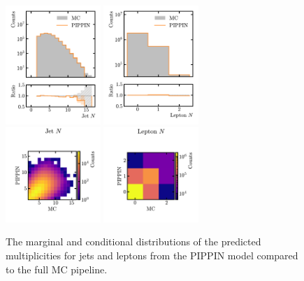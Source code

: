 \begin{figure}[htb]
    \centering
    \includegraphics[width=0.32\textwidth]{Figures/jet_generation/pippin/marginals/marginal_jet_n.pdf}
    \includegraphics[width=0.32\textwidth]{Figures/jet_generation/pippin/marginals/marginal_lep_n.pdf} \\
    \includegraphics[clip, trim=0cm 0cm 0cm 2.5cm, width=0.32\textwidth]{Figures/jet_generation/pippin/marginals_2D/marginal2D_jet_n.pdf}
    \includegraphics[clip, trim=0cm 0cm 0cm 2.5cm, width=0.32\textwidth]{Figures/jet_generation/pippin/marginals_2D/marginal2D_lep_n.pdf}
    \caption{
        The marginal and conditional distributions of the predicted multiplicities for jets and leptons from the PIPPIN model compared to the full MC pipeline.
    }
    \label{fig:pippin_n}
\end{figure}

